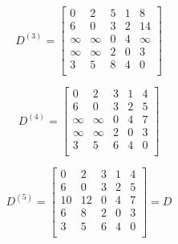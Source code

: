 \documentclass{article}
\begin{document}
\[
D^{(3)} = 
\left[
\begin{array}{ccccc}
0 & 2 & 5 & 1 & 8 \\
6 & 0 & 3 & 2 & 14 \\
\infty & \infty & 0 & 4 & \infty \\
\infty & \infty & 2 & 0 & 3 \\
3 & 5 & 8 & 4 & 0 \\
\end{array}
\right]
\]

\[
D^{(4)} = 
\left[
\begin{array}{ccccc}
0 & 2 & 3 & 1 & 4 \\
6 & 0 & 3 & 2 & 5 \\
\infty & \infty & 0 & 4 & 7 \\
\infty & \infty & 2 & 0 & 3 \\
3 & 5 & 6 & 4 & 0 \\
\end{array}
\right]
\]

\[
D^{(5)} = 
\left[
\begin{array}{ccccc}
0 & 2 & 3 & 1 & 4 \\
6 & 0 & 3 & 2 & 5 \\
10 & 12 & 0 & 4 & 7 \\
6 & 8 & 2 & 0 & 3 \\
3 & 5 & 6 & 4 & 0 \\
\end{array}
\right]
= D
\]
\end{document}
